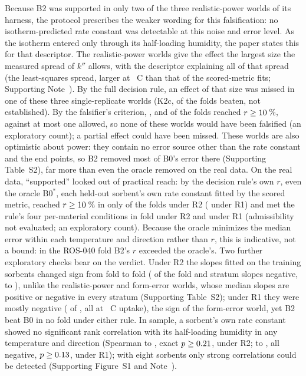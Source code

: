 \documentclass[12pt]{article}
\newcommand{\kpp}{k''}
\begin{document}
Because B2 was supported in only two of the three realistic-power worlds of its harness, the protocol prescribes the
weaker wording for this falsification: no isotherm-predicted rate constant was detectable at this noise and error
level. As the isotherm entered only through its half-loading humidity, the paper states this for that descriptor.
The realistic-power worlds give the effect the largest size the measured spread of $\kpp$ allows, with the descriptor
explaining all of that spread (the least-squares spread, larger at ~\textdegree C than that of the scored-metric fits;
Supporting Note~). By the full decision rule, an effect of that size was
missed in one of these three single-replicate worlds (K2c,  of the  folds beaten, not established). By the
falsifier's criterion, ,  and  of the  folds reached
$r \ge \V{res_marg3}{10}$\,\%, against at most one allowed, so none of these worlds would have been falsified (an
exploratory count); a partial effect could have been missed.
These worlds are also optimistic about power: they contain no error source other than the rate constant and the end
points, so B2 removed most of B0's error there (Supporting Table~S2), far more than even the oracle removed on the
real data. On the real data, ``supported'' looked out of practical reach: by the decision
rule's own $r$, even the oracle B0$^{*}$, each held-out sorbent's own rate constant fitted by the scored metric,
reached $r \ge \V{res_marg6}{10}$\,\% in only  of the  folds under R2 ( under
R1) and met the rule's four per-material conditions in  fold under R2 and  under R1
(admissibility not evaluated; an exploratory count). Because the oracle minimizes the median error within each
temperature and direction rather than $r$, this is indicative, not a bound: in the ROS-040 fold B2's $r$ exceeded the
oracle's. Two further exploratory checks bear on the verdict. Under R2 the slopes fitted on the training
sorbents changed sign from fold to fold ( of the  fold and stratum slopes negative,
 to ), unlike the realistic-power and form-error worlds, whose median slopes
are positive or negative in every stratum (Supporting Table~S2); under R1 they were mostly negative ( of , all
 at ~\textdegree C uptake), the sign of the form-error world, yet B2 beat B0 in no fold
under either rule. In sample, a sorbent's own rate constant showed no significant rank correlation with its
half-loading humidity in any temperature and direction (Spearman  to , exact
$p \ge \V{res_rho_p}{0.21}$, under R2;  to , all negative, $p \ge
\V{res_rho1_p}{0.13}$, under R1); with eight sorbents only strong correlations could be detected (Supporting
Figure~S1 and Note~).
\end{document}
